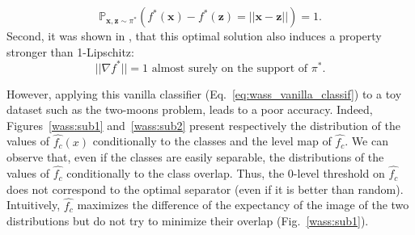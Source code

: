 \begin{equation}
\label{eq:transport_cost}
\mathbb{P}_{\textbf{x},\textbf{z}\sim \pi^*}(f^*(\textbf{x})-f^*(\textbf{z})=||\textbf{x}-\textbf{z}||)=1.
\end{equation}
 Second, it was shown in \cite{gulrajani2017improved,pmlr-v97-anil19a}, that this optimal solution also induces a property stronger  than 1-Lipschitz:
\begin{equation}
\label{eq:nabla_1}
||\nabla f^* ||=1 \text{ almost surely on the support of }\pi^*.
\end{equation}

However, applying this vanilla classifier (Eq.~\eqref{eq:wass_vanilla_classif}) to a toy dataset such as the two-moons problem, leads to a poor accuracy.
Indeed, Figures~\ref{wass:sub1} and~\ref{wass:sub2} present respectively the distribution of the values of $\hat{f_c}(x)$ conditionally to the classes and the level map of $\hat{f_c}$. We can observe that, even if the classes are easily separable, the distributions of the values of $\hat{f_c}$ conditionally to the class overlap. Thus, the 0-level threshold on $\hat{f_c}$ does not correspond to the optimal separator (even if it is better than random). Intuitively, $\hat{f_c}$  
maximizes the difference of the expectancy of the image of  
the two distributions but do not try to minimize their overlap (Fig.~\ref{wass:sub1}). 


